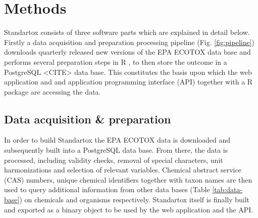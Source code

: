 
\section*{Methods}


Standartox consists of three software parts which are explained in detail below. Firstly a data acquisition and preparation processing pipeline (Fig. \ref{fig:pipeline}) downloads quarterly released new versions of the EPA ECOTOX data base and performs several preparation steps in R \citep{r_core_team_r_2017}, to then store the outcome in a PostgreSQL <CITE> data base. This constitutes the basis upon which the web application and and application programming interface (API) together with a R package are accessing the data. 

\subsection*{Data acquisition \& preparation}

In order to build Standartox the EPA ECOTOX data is downloaded and subsequently built into a PostgreSQL data base. From there, the data is processed, including validity checks, removal of special characters, unit harmonizations and selection of relevant variables. Chemical abstract service (CAS) numbers, unique chemical identifiers together with taxon names are then used to query additional information from other data bases (Table \ref{tab:data-base}) on chemicals and organisms respectively. Standartox itself is finally built and exported as a binary object to be used by the web application and the API.

